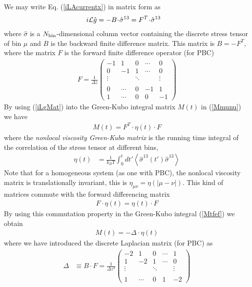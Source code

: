 \documentclass[a4paper,openright,12pt]{book}
\newcommand{\esc}{\!\cdot\!}
\newcommand{\llangle}{\left\langle}
\newcommand{\rrangle}{\right\rangle}
\begin{document}
We may write Eq. (\ref{iLAcurrentx}) in matrix form as
\begin{align}
  i{\cal L}\hat{g}&= -B\esc\hat{\sigma}^{13} =F^T\esc\hat{\sigma}^{13}
\label{iLgMat}
\end{align}
where  $\hat{\sigma}$ is  a  $N_{\rm  bin}$-dimensional column  vector
containing the  discrete stress tensor  of bin  $\mu$ and $B$  is the
backward finite difference matrix.  This matrix is $B=-F^T$, where the
matrix $ F$ is the forward finite difference operator (for PBC)
\begin{align}
 {F}=\frac{1}{\Delta z}\left(
    \begin{array}{rrrrr}
-1&1&0&\cdots&0\\
0&-1&1&\cdots&0\\
\vdots      &&\ddots&&\vdots\\
\\
0&\cdots&0&-1&1 
\\
1&\cdots&0&0&-1 \end{array}
\right)
\label{Dforward}
\end{align}
By using (\ref{iLgMat}) into the Green-Kubo integral matrix $M(t)$ in (\ref{Mmunu})
we have
\begin{align}
  M(t)=F^T\esc\eta(t)\esc F
\label{Mtfef}
\end{align}
where  the  \textit{nonlocal  viscosity  Green-Kubo  matrix}  is  the
running  time integral  of the  correlation  of the  stress tensor  at
different bins,
\begin{align}
  \eta(t) &=\frac{1}{k_BT}\int_0^{t}dt' 
  \llangle \hat{\sigma}^{13}(t')\hat{\sigma}^{13}\rrangle
\label{non-loc}
\end{align}
Note that  for a homogeneous system  (as one with PBC),  the nonlocal
viscosity    matrix   is    translationally    invariant,   this    is
$\eta_{\mu\nu}=\eta(|\mu-\nu|)$.  This kind  of matrices  commute with
the forward differencing matrix
\begin{align}
  F\esc\eta(t)=\eta(t)\esc F
\label{commute}
\end{align}
By using this commutation property 
 in the Green-Kubo
integral (\ref{Mtfef}) we obtain
\begin{align}
  M(t)=-\Delta\esc \eta(t)
\label{MmunuMat}
\end{align}
where we have introduced  the discrete Laplacian matrix (for PBC) as
\begin{align}
\Delta&\equiv  B\esc F
=\frac{1}{\Delta z^2}\left(
    \begin{array}{rrrrr}
-2&1&0&\cdots&1\\
1&-2&1&\cdots&0\\
\vdots      &&\ddots&&\vdots\\
\\
1&\cdots&0&1&-2    \end{array}
\right)
\end{align}
\end{document}
